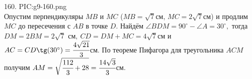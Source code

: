 160. {{PIC:g9-160.png}}\\
Опустим перпендикуляры $MB$ и $MC$ ($MB=\sqrt{7}$см, $MC=2\sqrt{7}$см) и продлим $MC$ до пересечения с $AB$ в точке $D.$ Найдём $\angle BDM=90^\circ-\angle A=30^\circ,$ тогда $DM=2BM=2\sqrt{7}\text{ см},\ CD=DM+MC=4\sqrt{7}$см и $AC=CD\tg(30^\circ)=\cfrac{4\sqrt{21}}{3}$см. По теореме Пифагора для треугольника $ACM$ получим $AM=\sqrt{\cfrac{112}{3}+28}=\cfrac{14\sqrt{3}}{3}$см.\newpage\noindent

